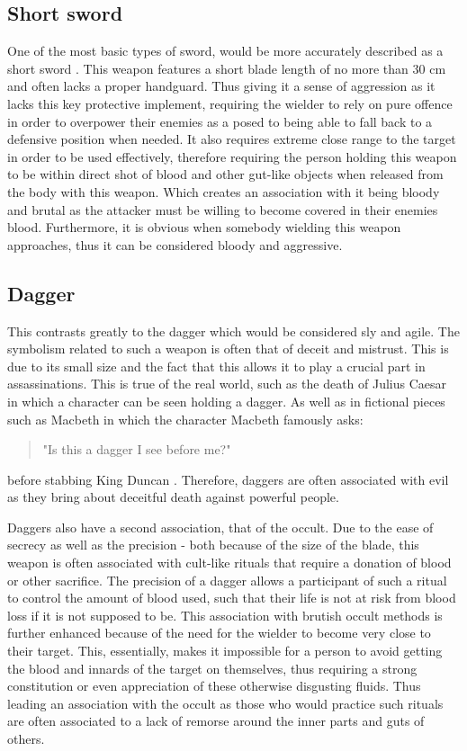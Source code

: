 \documentclass{article}
\begin{document}
\subsection{Short sword} \label{shortSwordSymbol}
One of the most basic types of sword, would be more accurately described as a short sword \parencite{mcnab2010swords}. This weapon features a short blade length of no more than 30 cm and often lacks a proper handguard. Thus giving it a sense of aggression as it lacks this key protective implement, requiring the wielder to rely on pure offence in order to overpower their enemies as a posed to being able to fall back to a defensive position when needed. It also requires extreme close range to the target in order to be used effectively, therefore requiring the person holding this weapon to be within direct shot of blood and other gut-like objects when released from the body with this weapon. Which creates an association with it being bloody and brutal as the attacker must be willing to become covered in their enemies blood. Furthermore, it is obvious when somebody wielding this weapon approaches, thus it can be considered bloody and aggressive.

\subsection{Dagger} \label{daggerSymbol}
This contrasts greatly to the dagger which would be considered sly and agile. The symbolism related to such a weapon is often that of deceit and mistrust. This is due to its small size and the fact that this allows it to play a crucial part in assassinations. This is true of the real world, such as the death of Julius Caesar \parencite{caesar} in which a character can be seen holding a dagger. As well as in fictional pieces such as Macbeth in which the character Macbeth famously asks: \begin{quote}
    "Is this a dagger I see before me?"
\end{quote}
before stabbing King Duncan \parencite{macbeth}. Therefore, daggers are often associated with evil as they bring about deceitful death against powerful people.

Daggers also have a second association, that of the occult. Due to the ease of secrecy as well as the precision - both because of the size of the blade, this weapon is often associated with cult-like rituals that require a donation of blood or other sacrifice. The precision of a dagger allows a participant of such a ritual to control the amount of blood used, such that their life is not at risk from blood loss if it is not supposed to be. This association with brutish occult methods is further enhanced because of the need for the wielder to become very close to their target. This, essentially, makes it impossible for a person to avoid getting the blood and innards of the target on themselves, thus requiring a strong constitution or even appreciation of these otherwise disgusting fluids. Thus leading an association with the occult as those who would practice such rituals are often associated to a lack of remorse around the inner parts and guts of others.
\end{document}
